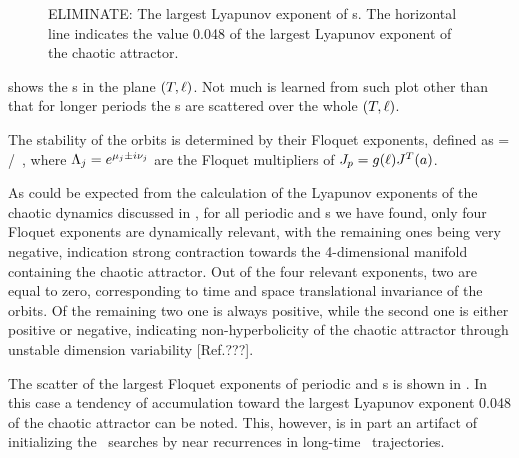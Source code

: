 \begin{figure}[t]
\caption{ELIMINATE: The largest Lyapunov exponent of \rpo s.  The horizontal
line indicates the value 0.048 of the largest Lyapunov exponent
of the chaotic attractor.
        } \label{f:ks22rposL}
\end{figure}


 shows the \rpo s in the plane 
$(\period{},\shift)$.  Not much is learned from such plot other than 
that for longer periods the \rpo s are scattered over the 
whole $(\period{},\shift)$.

The stability of the orbits is determined by their Floquet exponents,
defined as
\beq 
{} = \eigRe[j]/\period{} \,, 
where $\ExpaEig_j = e^{\eigRe[j] \pm i \eigIm[j]}$ are the 
Floquet multipliers of $\jMps_p = g(\shift)J^T(a)$.  


As could be expected from the calculation of the Lyapunov 
exponents of the chaotic dynamics discussed in , 
for all periodic and \rpo s we have found, only four Floquet 
exponents are dynamically relevant, with the remaining ones being
very negative, indication strong contraction towards the 4-dimensional
manifold containing the chaotic attractor.  Out of the four 
relevant exponents, two are equal to zero, corresponding to 
time and space translational invariance of the orbits.  Of the
remaining two one is always positive, while the second one is either
positive or negative, indicating non-hyperbolicity of the
chaotic attractor through unstable dimension variability 
[Ref.???].

The scatter of the %
largest Floquet exponents 
of periodic and \rpo s is shown in . 
In this case a tendency of accumulation toward the largest 
Lyapunov exponent 0.048 of the chaotic attractor
can be noted.  This, however, is in part an artifact of initializing
the \rpo\ searches by near recurrences in 
long-time \statesp\ trajectories.

